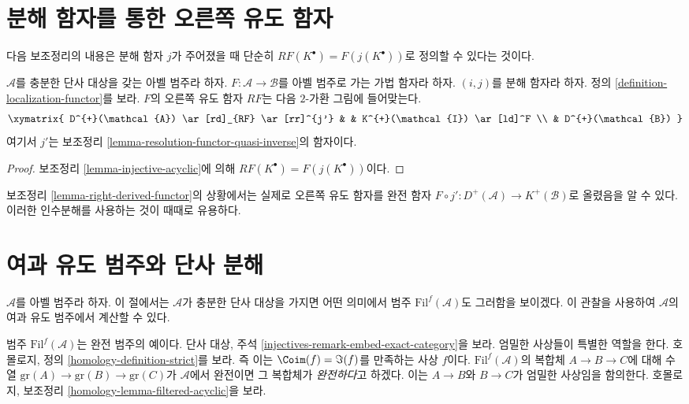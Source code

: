 \section{분해 함자를 통한 오른쪽 유도 함자}
\label{section-right-derived-functor-via-resolutions}

\noindent
다음 보조정리의 내용은 분해 함자 $j$가 주어졌을 때 단순히
$RF(K^\bullet) = F(j(K^\bullet))$로 정의할 수 있다는 것이다.

\begin{lemma}
\label{lemma-right-derived-functor}
$\mathcal{A}$를 충분한 단사 대상을 갖는 아벨 범주라 하자.
$F : \mathcal{A} \to \mathcal{B}$를 아벨 범주로 가는 가법 함자라 하자.
$(i, j)$를 분해 함자라 하자. 정의
\ref{definition-localization-functor}를 보라. $F$의 오른쪽 유도 함자
$RF$는 다음 $2$-가환 그림에 들어맞는다.
$$
\xymatrix{
D^{+}(\mathcal{A}) \ar[rd]_{RF} \ar[rr]^{j'} & &
K^{+}(\mathcal{I}) \ar[ld]^F \\
& D^{+}(\mathcal{B})
}
$$
여기서 $j'$는 보조정리
\ref{lemma-resolution-functor-quasi-inverse}의 함자이다.
\end{lemma}

\begin{proof}
보조정리 \ref{lemma-injective-acyclic}에 의해
$RF(K^\bullet) = F(j(K^\bullet))$이다.
\end{proof}

\begin{remark}
\label{remark-right-derived-functor}
보조정리 \ref{lemma-right-derived-functor}의 상황에서는 실제로 오른쪽
유도 함자를 완전 함자
$F \circ j' : D^{+}(\mathcal{A}) \to K^{+}(\mathcal{B})$로 올렸음을
알 수 있다. 이러한 인수분해를 사용하는 것이 때때로 유용하다.
\end{remark}

\section{여과 유도 범주와 단사 분해}
\label{section-filtered-derived}

\noindent
$\mathcal{A}$를 아벨 범주라 하자. 이 절에서는 $\mathcal{A}$가 충분한
단사 대상을 가지면 어떤 의미에서 범주 $\text{Fil}^f(\mathcal{A})$도
그러함을 보이겠다. 이 관찰을 사용하여 $\mathcal{A}$의 여과 유도
범주에서 계산할 수 있다.

\medskip\noindent
범주 $\text{Fil}^f(\mathcal{A})$는 완전 범주의 예이다. 단사 대상,
주석 \ref{injectives-remark-embed-exact-category}을 보라.
엄밀한 사상들이 특별한 역할을 한다. 호몰로지, 정의
\ref{homology-definition-strict}를 보라. 즉 이는
$\Coim(f) = \Im(f)$를 만족하는 사상 $f$이다.
$\text{Fil}^f(\mathcal{A})$의 복합체 $A \to B \to C$에 대해 수열
$\text{gr}(A) \to \text{gr}(B) \to \text{gr}(C)$가 $\mathcal{A}$에서
완전이면 그 복합체가 {\it 완전하다}고 하겠다. 이는 $A \to B$와
$B \to C$가 엄밀한 사상임을 함의한다. 호몰로지, 보조정리
\ref{homology-lemma-filtered-acyclic}을 보라.


